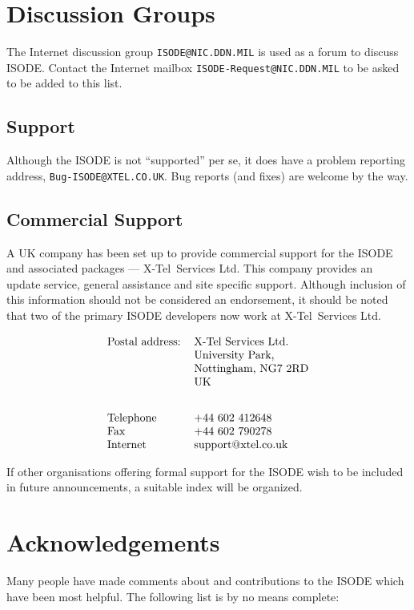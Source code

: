 \newpage\section*	{Discussion Groups}
The Internet discussion group {\tt ISODE@NIC.DDN.MIL\/} is
used as a forum to discuss ISODE.
Contact the Internet mailbox {\tt ISODE-Request@NIC.DDN.MIL\/}
to be asked to be added to this list.

\subsection*{Support}
Although the ISODE is not ``supported'' per se, it does have a problem
reporting address, {\tt Bug-ISODE@XTEL.CO.UK\/}.  
Bug reports (and fixes) are
welcome by the way. 

\subsection*{Commercial Support}
A UK company has been set up to provide commercial support for the ISODE and
associated packages --- X-Tel~Services Ltd.  This company provides an update
service, general assistance and site specific support.  Although inclusion
of this information should not be considered an endorsement, it should be
noted that two of the primary ISODE developers now work at X-Tel~Services
Ltd.

\[\begin{tabular}{ll}
Postal address:&	X-Tel Services Ltd.\\
&	University Park,\\
&	Nottingham, NG7 2RD\\
&        UK\\[2em]
Telephone&	+44 602 412648\\
Fax&		+44 602 790278\\
Internet&	support@xtel.co.uk\\
\end{tabular}\]

If other organisations offering formal support for the ISODE wish to be
included in future announcements, a suitable index will be organized.



\newpage\section*	{Acknowledgements}
Many people have made comments about and contributions to the ISODE which have
been most helpful.
The following list is by no means complete:

